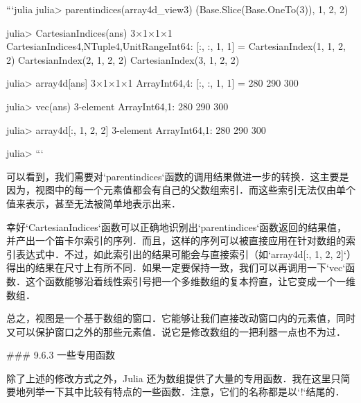 ```julia
julia> parentindices(array4d_view3)
(Base.Slice(Base.OneTo(3)), 1, 2, 2)

julia> CartesianIndices(ans)
3×1×1×1 CartesianIndices{4,NTuple{4,UnitRange{Int64}}}:
[:, :, 1, 1] =
 CartesianIndex(1, 1, 2, 2)
 CartesianIndex(2, 1, 2, 2)
 CartesianIndex(3, 1, 2, 2)

julia> array4d[ans]
3×1×1×1 Array{Int64,4}:
[:, :, 1, 1] =
 280
 290
 300

julia> vec(ans)
3-element Array{Int64,1}:
 280
 290
 300

julia> array4d[:, 1, 2, 2]
3-element Array{Int64,1}:
 280
 290
 300

julia> 
```

可以看到，我们需要对`parentindices`函数的调用结果做进一步的转换．这主要是因为，视图中的每一个元素值都会有自己的父数组索引．而这些索引无法仅由单个值来表示，甚至无法被简单地表示出来．

幸好`CartesianIndices`函数可以正确地识别出`parentindices`函数返回的结果值，并产出一个笛卡尔索引的序列．而且，这样的序列可以被直接应用在针对数组的索引表达式中．不过，如此索引出的结果可能会与直接索引（如`array4d[:, 1, 2, 2]`）得出的结果在尺寸上有所不同．如果一定要保持一致，我们可以再调用一下`vec`函数．这个函数能够沿着线性索引号把一个多维数组的复本捋直，让它变成一个一维数组．

总之，视图是一个基于数组的窗口．它能够让我们直接改动窗口内的元素值，同时又可以保护窗口之外的那些元素值．说它是修改数组的一把利器一点也不为过．

### 9.6.3 一些专用函数

除了上述的修改方式之外，Julia 还为数组提供了大量的专用函数．我在这里只简要地列举一下其中比较有特点的一些函数．注意，它们的名称都是以`!`结尾的．

